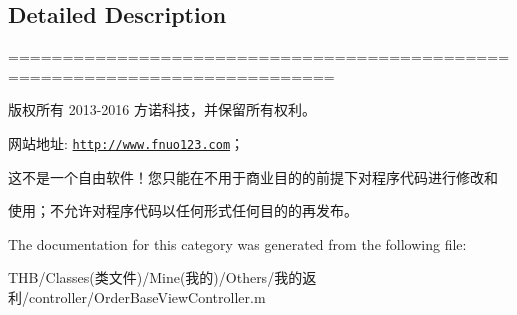\subsection{Detailed Description}
============================================================================

版权所有 2013-\/2016 方诺科技，并保留所有权利。

网站地址\+: \href{http://www.fnuo123.com}{\tt http\+://www.\+fnuo123.\+com}； 



这不是一个自由软件！您只能在不用于商业目的的前提下对程序代码进行修改和

使用；不允许对程序代码以任何形式任何目的的再发布。 

 

The documentation for this category was generated from the following file\+:\begin{DoxyCompactItemize}
\item 
T\+H\+B/\+Classes(类文件)/\+Mine(我的)/\+Others/我的返利/controller/Order\+Base\+View\+Controller.\+m\end{DoxyCompactItemize}
